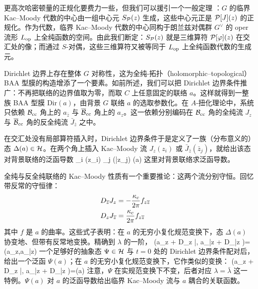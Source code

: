 更高次哈密顿量的正规化要费力一些，但我们可以援引一个一般定理 \cite{BD}：$G$ 的临界 Kac–Moody 代数的中心由一组中心元 $S_{\P}(z)$ 生成，这些中心元正是 ${\cal P}[J](z)$ 的正规化。作为代数，临界 Kac–Moody 代数的中心同构于朗兰兹对偶群 $G^\vee$ 的 oper 流形 $L_\op$ 上全纯函数的空间。由此我们断定：$S_{\P}(z)$ 就是三维算符 ${\cal P}[\varphi](z)$ 在交汇处的像；而通过 $S$-对偶，这些三维算符又被等同于 $L_\op$ 上全纯函数代数的生成元。

Dirichlet 边界上存在整体 $G$ 对称性，这为全纯-拓扑（holomorphic–topological）BAA 型膜的构造增添了一个要素。如前所述，我们可以把 Dirichlet 边界条件推广：不再把联络的边界值取为零，而取 $C$ 上任意固定的联络 $a$。这样就得到一整族 BAA 型膜 $\mathrm{Dir}(a)$，由背景 $G$ 联络 $a$ 的选取参数化。在 $A$-扭化理论中，系统只依赖 $\B_\cc$ 角上的 $a_{\bar z}$ 与 $\bar \B_\cc$ 角上的 $a_z$。这一依赖分别编码在 $\B_\cc$ 角的全纯流 $J_z$ 与 $\bar \B_\cc$ 角的反全纯流 $\bar J_{\bar z}$ 之中。

在交汇处没有局部算符插入时，Dirichlet 边界条件于是定义了一族（分布意义的）态 $\Delta(a) \in \H$。在两个角上插入 Kac–Moody 流 $J_z(z_i)$ 或 $\bar J_{\bar z}(\bar z_j)$，就给出该态对背景联络的泛函导数
\be
\prod_i (z_i) \prod_j (\bar z_j) \Delta(a)
\ee 
这里对背景联络求泛函导数。
 
全纯与反全纯联络的 Kac–Moody 性质有一个重要推论：这两个流分别守恒。回忆带反常的守恒律：
\begin{align}
D_{\bar z} J_z &= - \frac{\kappa_c}{2 \pi} f_{z \bar z} \cr
D_z J_{\bar z} &= \frac{\kappa_c}{2 \pi} f_{z \bar z}
\end{align}
其中 $f$ 是 $a$ 的曲率。这些式子表明：在 $a$ 的无穷小复化规范变换下，态 $\Delta(a)$ 协变地、但带有反常地变换。精确到 $\lambda$ 的一阶，
\be 
\Delta(a_z + D_z \bar \lambda, a_{\bar z} + D_{\bar z} \lambda )= \Delta(a_z,a_{\bar z})
\ee
一个足够好的抽象态 $\Psi \in \H$ 与 $t=0$ 处的 Dirichlet 边界条件配对后，给出一个泛函 $\Psi(a)$；在 $a$ 的无穷小复化规范变换下，它作类似的变换：
\be \label{eq:cogauge}
\Psi(a_z + D_z \bar \lambda, a_{\bar z} + D_{\bar z} \lambda )= \Psi(a)
\ee  注意，$\Psi$ 在实规范变换下不变，后者对应 $\lambda=\bar\lambda$ 这一特例。$\Psi(a)$ 对 $a$ 的泛函导数给出临界 Kac–Moody 流与 $a$ 耦合的关联函数。

